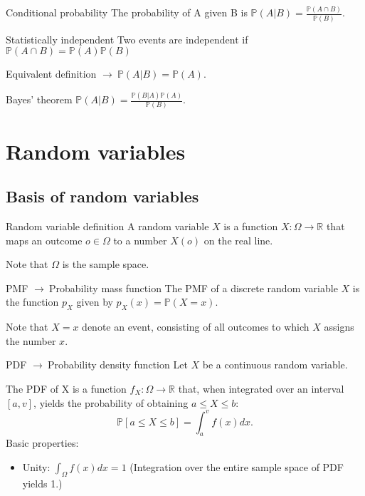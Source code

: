 \documentclass[11pt,a4paper,fleqn]{article}
\numberwithin{equation}{section}
\newcommand{\prob}{\mathbb{P}}
\newcommand{\samplespace}{\Omega}
\newcommand{\g}{$\rightarrow\ $}
\begin{document}
\begin{fact}{Conditional probability}{}
    The probability of A given B is $\prob(A|B) = \frac{\prob(A\cap B)}{\prob(B)}$.
\end{fact}

\begin{fact}{Statistically independent}{}
    Two events are independent if $\prob(A\cap B) = \prob(A)\prob(B)$
\end{fact}

Equivalent definition \g $\prob(A|B) = \prob(A)$.

\begin{fact}{Bayes’ theorem}{}
    $\prob(A|B) = \frac{\prob (B|A)\prob(A)}{\prob(B)}$.
\end{fact}

\section{Random variables}

\subsection{Basis of random variables}

\begin{fact}{Random variable definition}{}
    A random variable $X$ is a function $X:\samplespace\rightarrow\mathbb{R}$ that maps an outcome $o\in\samplespace$ to a number $X(o)$ on the real line.
    
    Note that $\Omega$ is the sample space.
\end{fact}

\begin{fact}{PMF \g Probability mass function}{}
    The PMF of a discrete random variable $X$ is the function $p_X$ given by $p_X(x) = \mathbb{P}(X=x)$.
    
    Note that $X=x$ denote an event, consisting of all outcomes to which $X$ assigns the number $x$.
\end{fact}

\begin{fact}{PDF \g Probability density function}{}
    Let $X$ be a continuous random variable.
    
    The PDF of X is a function $f_X\mathbin{:}\Omega\rightarrow\mathbb{R}$ that, when integrated
    over an interval $[a,v]$, yields the probability of obtaining $a\le X \le b$:
    \begin{equation*}
        \mathbb{P}[a\le X \le b] = \int_{a}^{v}f(x)dx.
    \end{equation*}
    Basic properties:
    \begin{itemize}
        \item Unity: $\int_\samplespace f(x)dx=1$ (Integration over the entire sample space of PDF yields 1.)
    \end{itemize}
\end{fact}
\end{document}

